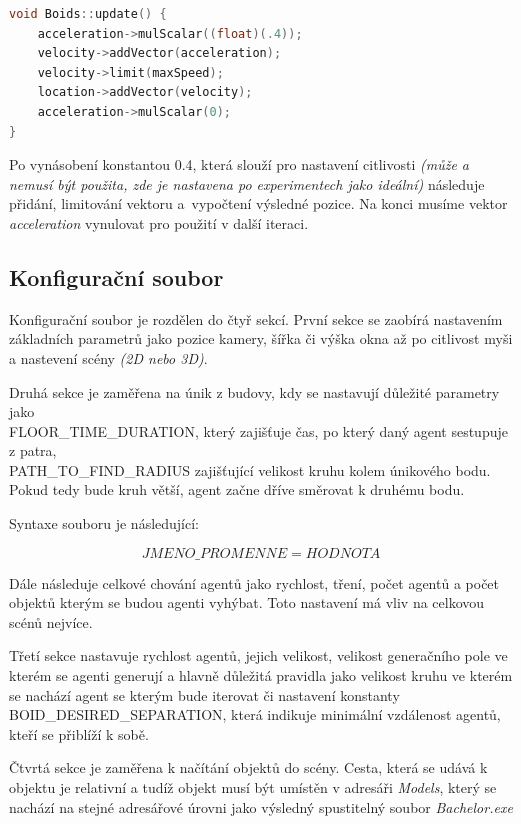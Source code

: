 \documentclass[czech,public,dept460,male,cpdeclaration]{diploma}
\begin{document}
\begin{lstlisting}[language=c++,label=src:seek,caption=Nastavení výsledné pozice agenta] 
void Boids::update() {
	acceleration->mulScalar((float)(.4));
	velocity->addVector(acceleration);
	velocity->limit(maxSpeed);
	location->addVector(velocity);
	acceleration->mulScalar(0);
}
\end{lstlisting}

Po vynásobení konstantou 0.4, která slouží pro nastavení citlivosti \textit{(může a nemusí být použita, zde je nastavena po experimentech jako ideální)} následuje přidání, limitování vektoru a~vypočtení výsledné pozice. Na konci musíme vektor \textit{acceleration} vynulovat pro použití v další iteraci.

\subsection{Konfigurační soubor}
Konfigurační soubor je rozdělen do čtyř sekcí. První sekce se zaobírá nastavením základních parametrů jako pozice kamery, šířka či výška okna až po citlivost myši a nastevení scény \textit{(2D nebo 3D)}. 

Druhá sekce je zaměřena na únik z budovy, kdy se nastavují důležité parametry jako \\FLOOR\_TIME\_DURATION, který zajišťuje čas, po který daný agent sestupuje z patra, \\PATH\_TO\_FIND\_RADIUS zajišťující velikost kruhu kolem únikového bodu. Pokud tedy bude kruh větší, agent začne dříve směrovat k druhému bodu.

Syntaxe souboru je následující:

\[JMENO\_PROMENNE=HODNOTA\]

Dále následuje celkové chování agentů jako rychlost, tření, počet agentů a počet objektů kterým se budou agenti vyhýbat. Toto nastavení má vliv na celkovou scénů nejvíce.

Třetí sekce nastavuje rychlost agentů, jejich velikost, velikost generačního pole ve kterém se agenti generují a hlavně důležitá pravidla jako velikost kruhu ve kterém se nachází agent se kterým bude iterovat či nastavení konstanty BOID\_DESIRED\_SEPARATION, která indikuje minimální vzdálenost agentů, kteří se přiblíží k sobě.

Čtvrtá sekce je zaměřena k načítání objektů do scény. Cesta, která se udává k objektu je relativní a tudíž objekt musí být umístěn v adresáři \textit{Models}, který se nachází na stejné adresářové úrovni jako výsledný spustitelný soubor \textit{Bachelor.exe}
\end{document}
